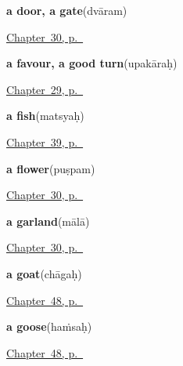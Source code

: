 \noindent\begin{minipage}[t]{\linewidth}
\raggedright
\textbf{a door, a gate}\enspace\emph{}\enspace(dvāram)\par
\footnotesize \hyperref[ch:sa-welcome]{Chapter~30, p.~\pageref*{ch:sa-welcome}}
\end{minipage}\par\smallskip

\noindent\begin{minipage}[t]{\linewidth}
\raggedright
\textbf{a favour, a good turn}\enspace\emph{}\enspace(upakāraḥ)\par
\footnotesize \hyperref[ch:sa-courtesy]{Chapter~29, p.~\pageref*{ch:sa-courtesy}}
\end{minipage}\par\smallskip

\noindent\begin{minipage}[t]{\linewidth}
\raggedright
\textbf{a fish}\enspace\emph{}\enspace(matsyaḥ)\par
\footnotesize \hyperref[ch:sa-animals]{Chapter~39, p.~\pageref*{ch:sa-animals}}
\end{minipage}\par\smallskip

\noindent\begin{minipage}[t]{\linewidth}
\raggedright
\textbf{a flower}\enspace\emph{}\enspace(puṣpam)\par
\footnotesize \hyperref[ch:sa-welcome]{Chapter~30, p.~\pageref*{ch:sa-welcome}}
\end{minipage}\par\smallskip

\noindent\begin{minipage}[t]{\linewidth}
\raggedright
\textbf{a garland}\enspace\emph{}\enspace(mālā)\par
\footnotesize \hyperref[ch:sa-welcome]{Chapter~30, p.~\pageref*{ch:sa-welcome}}
\end{minipage}\par\smallskip

\noindent\begin{minipage}[t]{\linewidth}
\raggedright
\textbf{a goat}\enspace\emph{}\enspace(chāgaḥ)\par
\footnotesize \hyperref[ch:sa-more-animals]{Chapter~48, p.~\pageref*{ch:sa-more-animals}}
\end{minipage}\par\smallskip

\noindent\begin{minipage}[t]{\linewidth}
\raggedright
\textbf{a goose}\enspace\emph{}\enspace(haṁsaḥ)\par
\footnotesize \hyperref[ch:sa-more-animals]{Chapter~48, p.~\pageref*{ch:sa-more-animals}}
\end{minipage}\par\smallskip

